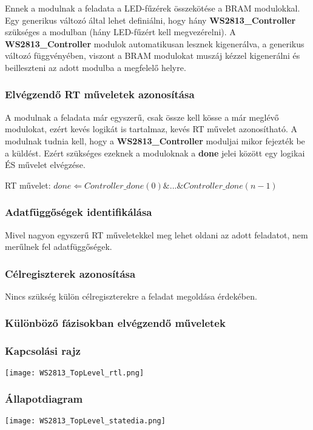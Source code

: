 \tab Ennek a modulnak a feladata a LED-fűzérek összekötése a BRAM modulokkal. Egy generikus változó által lehet definiálni, hogy hány \textbf{WS2813\_Controller} szükséges a modulban (hány LED-fűzért kell megvezérelni).
A \textbf{WS2813\_Controller} modulok automatikusan lesznek kigenerálva, a generikus változó függvényében, viszont a BRAM modulokat muszáj kézzel kigenerálni és beilleszteni az adott modulba a megfelelő helyre.

\subsubsection{Elvégzendő RT műveletek azonosítása}

\tab A modulnak a feladata már egyszerű, csak össze kell kösse a már meglévő modulokat, ezért kevés logikát is tartalmaz, kevés RT művelet azonosítható. 
A modulnak tudnia kell, hogy a \textbf{WS2813\_Controller} moduljai mikor fejezték be a küldést. Ezért szükséges ezeknek a moduloknak a \textbf{done} jelei között egy logikai ÉS művelet elvégzése.

\tab RT művelet: $done \Leftarrow Controller\_done(0) \& ... \& Controller\_done(n - 1)$


\subsubsection{Adatfüggőségek identifikálása}

\tab Mivel nagyon egyszerű RT műveletekkel meg lehet oldani az adott feladatot, nem merűlnek fel adatfüggőségek.


\subsubsection{Célregiszterek azonosítása}

\tab Nincs szükség külön célregiszterekre a feladat megoldása érdekében.


\subsubsection{Különböző fázisokban elvégzendő műveletek}


\subsubsection{Kapcsolási rajz}

\texttt{[image: WS2813\_TopLevel\_rtl.png]}

\subsubsection{Állapotdiagram}

\texttt{[image: WS2813\_TopLevel\_statedia.png]}